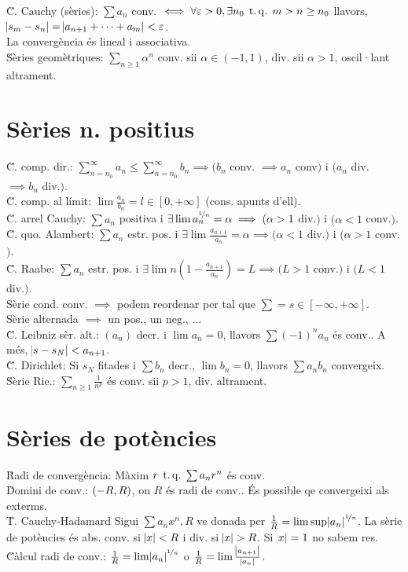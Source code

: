 \u{C. Cauchy (sèries)}: $\sum a_n$ conv. $\iff \forall \varepsilon > 0, \exists n_0 \operatorname{\;t.q.\;} m>n\geq n_0$ llavors, $\abs{s_m-s_n} = \abs{a_{n+1} + \dots + a_m} < \varepsilon$. \\
\ci La convergència és lineal i associativa. \\
\u{S\`eries geom\`etriques}: $\sum_{n \geq 1} \alpha^n$ conv. sii $\alpha \in (-1, 1)$, div. sii $\alpha > 1$, oscil·lant altrament.

\section{Sèries n. positius}

\u{C. comp. dir.}: $\sum_{n=n_0}^\infty a_n \leq \sum_{n=n_0}^\infty b_n \implies (b_n$ conv. $\implies a_n$ conv$)$ i $(a_n$ div. $\implies b_n$ div.$)$. \\
\u{C. comp. al límit}: $\lim\frac{a_n}{b_n}=l\in[0,+\infty]$ (cons. apunts d'ell).\\
\u{C. arrel Cauchy}: $\sum a_n$ positiva i $\exists \lim a_n^{\nicefrac{1}{n}}=\alpha \implies (\alpha >1$ div.$)$ i $(\alpha < 1$ conv.$)$.\\
\u{C. quo. Alambert}: $\sum a_n$ estr. pos. i $\exists\lim\frac{a_{n+1}}{a_n}=\alpha \implies (\alpha <1$ div.$)$ i $(\alpha > 1$ conv.$)$.\\
\u{C. Raabe}: $\sum a_n$ estr. pos. i $\exists\lim n\left(1-\frac{a_{n+1}}{a_n}\right) = L \implies (L > 1$ conv.$)$ i $(L<1$ div.$)$.\\
\ci Sèrie cond. conv. $\implies$ podem reordenar per tal que $\sum = s\in\left[-\infty, +\infty\right]$.\\
\ci Sèrie alternada $\implies$ un pos., un neg., ... \\
\u{C. Leibniz sèr. alt.}: $(a_n)$ decr. i $\lim a_n = 0$, llavors $\sum (-1)^na_n$ és conv.. A més, $\abs{s-s_N} < a_{n+1}$. \\
\u{C. Dirichlet}: Si $s_N$ fitades i $\sum b_n$ decr., $\lim b_n = 0$, llavors $\sum a_nb_n$ convergeix. \\
\u{S\`erie Rie.}: $\sum_{n \geq 1} \frac{1}{n^p}$ \'es conv. sii $p > 1$, div. altrament.

\section{Sèries de potències}

\u{Radi de convergència}: Màxim $r \operatorname{\;t.q.\;} \sum a_nr^n$ és conv. \\
\u{Domini de conv.}: $\left( -R, R\right)$, on $R$ és radi de conv.. És possible qe convergeixi als exterms. \\
\u{T. Cauchy-Hadamard} Sigui $\sum a_nx^n, R$ ve donada per $\frac{1}{R} = \lim \sup \abs{a_n}^{\nicefrac{1}{n}}$. La sèrie de potències és abs. conv. si $\abs{x} < R$ i div. si $\abs{x} > R$. Si $\abs{x} = 1$ no sabem res. \\
\u{Càlcul radi de conv.}: $\frac{1}{R} = \lim \abs{a_n}^{\nicefrac{1}{n}}$ o $\frac{1}{R} = \lim\frac{\abs{a_{n+1}}}{\abs{a_n}}$.

